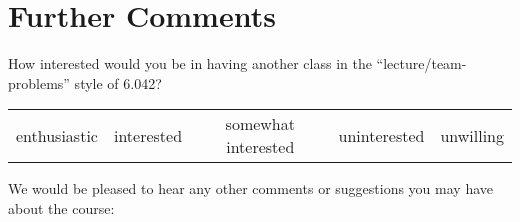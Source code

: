 \documentclass[handout]{mcs}
\begin{document}
\newpage
\section*{Further Comments}

How interested would you be in having another class in the
``lecture/team-problems'' style of 6.042?
\begin{center}
\begin{tabular}{ccccc}
enthusiastic &  interested &  somewhat interested  &  uninterested &  unwilling
\end{tabular}
\end{center}

\vspace{0.5in}
We would be pleased to hear any other comments or suggestions you may have
about the course:

\textbox{\hspace{7in}
\vspace{6in}}
\end{document}

